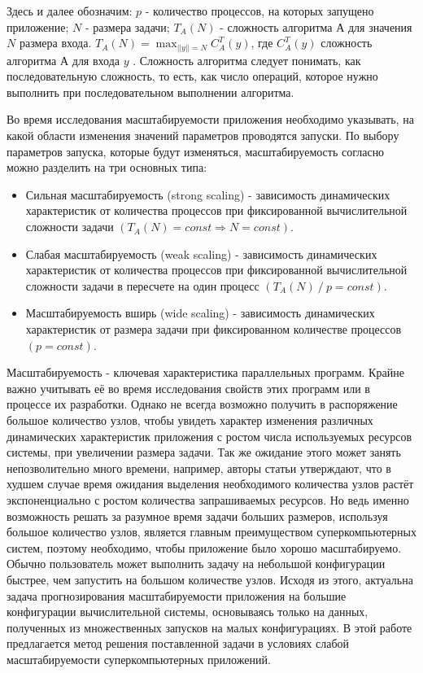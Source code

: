 	Здесь и далее обозначим: \(p\) - количество процессов, на которых запущено приложение; \(N\) - размера задачи; \(T_A(N)\) - сложность алгоритма \(А\) для значения \(N\) размера входа. \(T_A(N) = \max_{||y|| = N} C^T_A(y)\), где \(C^T_A(y)\) сложность алгоритма \(А\) для входа \(y\) \cite{COMPLEXITY}. Сложность алгоритма следует понимать, как последовательную сложность, то есть, как число операций, которое нужно выполнить при последовательном выполнении алгоритма.

	Во время исследования масштабируемости приложения необходимо указывать, на какой области изменения значений параметров проводятся запуски. По выбору параметров запуска, которые будут изменяться, масштабируемость согласно \cite{scaling_types} можно разделить на три основных типа:
	\begin{itemize}
		\item Сильная масштабируемость (strong scaling) - зависимость динамических характеристик от количества процессов при фиксированной вычислительной сложности задачи \((T_A(N) = const \Rightarrow N = const)\).
		\item Слабая масштабируемость (weak scaling) - зависимость динамических характеристик от количества процессов при фиксированной вычислительной сложности задачи в пересчете на один процесс \((T_A(N)\:/\:p = const)\).
		\item Масштабируемость вширь (wide scaling) - зависимость динамических характеристик от размера задачи при фиксированном количестве процессов \((p = const)\).
	\end{itemize}

	Масштабируемость - ключевая характеристика параллельных программ. Крайне важно учитывать её во время исследования свойств этих программ или в процессе их разработки.
	Однако не всегда возможно получить в распоряжение большое количество узлов, чтобы увидеть характер изменения различных динамических характеристик приложения с ростом числа используемых ресурсов системы, при увеличении размера задачи. Так же ожидание этого может занять непозволительно много времени, например, авторы статьи \cite{log_main} утверждают, что в худшем случае время ожидания выделения необходимого количества узлов растёт экспоненциально с ростом количества запрашиваемых ресурсов. Но ведь именно возможность решать за разумное время задачи больших размеров, используя большое количество узлов, является главным преимуществом суперкомпьютерных систем, поэтому необходимо, чтобы приложение было хорошо масштабируемо. Обычно пользователь может выполнить задачу на небольшой конфигурации быстрее, чем запустить на большом количестве узлов. Исходя из этого, актуальна задача прогнозирования масштабируемости приложения на большие конфигурации вычислительной системы, основываясь только на данных, полученных из множественных запусков на малых конфигурациях.
	В этой работе предлагается метод решения поставленной задачи в условиях слабой масштабируемости суперкомпьютерных приложений.

\clearpage
